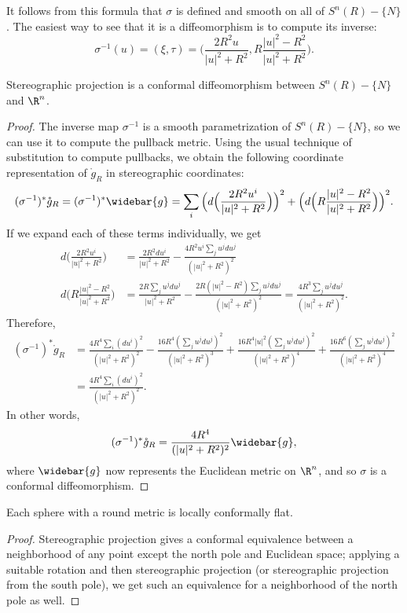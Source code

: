 It follows from this formula that $\sigma$ is defined and smooth on all of $S^n(R)-\{N\}$. The easiest way to see that it is a diffeomorphism is to compute its inverse:
\[\sigma^{-1}(u)=(\xi,\tau)=\Big(\frac{2R^2u}{|u|^2+R^2},R\frac{|u|^2-R^2}{|u|^2+R^2}\Big).\]
\begin{proposition}
Stereographic projection is a conformal diffeomorphism between $S^n(R)-\{N\}$ and $\R^n$.
\end{proposition}
\begin{proof}
The inverse map $\sigma^{-1}$ is a smooth parametrization of $S^n(R)-\{N\}$, so we can use it to compute the pullback metric. Using the usual technique of substitution to compute pullbacks, we obtain the following coordinate representation of $\mathring{g}_R$ in stereographic coordinates:
\[(\sigma^{-1})^*\mathring{g}_R=(\sigma^{-1})^*\widebar{g}=\sum_i\Big(d\Big(\frac{2R^2u^i}{|u|^2+R^2}\Big)\Big)^2+\Big(d\Big(R\frac{|u|^2-R^2}{|u|^2+R^2}\Big)\Big)^2.\]
If we expand each of these terms individually, we get
\begin{align*}
d\Big(\frac{2R^2u^i}{|u|^2+R^2}\Big)&=\frac{2R^2du^i}{|u|^2+R^2}-\frac{4R^2u^i\sum_ju^jdu^j}{(|u|^2+R^2)^2}\\
d\Big(R\frac{|u|^2-R^2}{|u|^2+R^2}\Big)&=\frac{2R\sum_ju^jdu^j}{|u|^2+R^2}-\frac{2R(|u|^2-R^2)\sum_ju^jdu^j}{(|u|^2+R^2)^2}=\frac{4R^3\sum_ju^jdu^j}{(|u|^2+R^2)^2}.
\end{align*}
Therefore,
\begin{align*}
(\sigma^{-1})^*\mathring{g}_R&=\frac{4R^4\sum_i(du^i)^2}{(|u|^2+R^2)^2}-\frac{16R^4(\sum_ju^jdu^j)^2}{(|u|^2+R^2)^3}+\frac{16R^4|u|^2(\sum_ju^jdu^j)^2}{(|u|^2+R^2)^4}+\frac{16R^6(\sum_ju^jdu^j)^2}{(|u|^2+R^2)^4}\\
&=\frac{4R^4\sum_i(du^i)^2}{(|u|^2+R^2)^2}.
\end{align*}
In other words,
\[(\sigma^{-1})^*\mathring{g}_R=\frac{4R^4}{(|u|^2+R^2)^2}\widebar{g},\]
where $\widebar{g}$ now represents the Euclidean metric on $\R^n$, and so $\sigma$ is a conformal
diffeomorphism.
\end{proof}
\begin{corollary}
Each sphere with a round metric is locally conformally flat.
\end{corollary}
\begin{proof}
Stereographic projection gives a conformal equivalence between a neighborhood of any point except the north pole and Euclidean space; applying a suitable rotation and then stereographic projection (or stereographic projection from the south pole), we get such an equivalence for a neighborhood of the north pole as well.
\end{proof}
